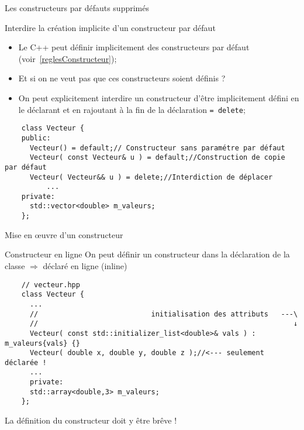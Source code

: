 \documentclass[compress,10pt,aspectratio=169]{beamer}
\begin{document}
    \begin{frame}[fragile]{Les constructeurs par défauts supprimés}
    \scriptsize
    
    \begin{block}{\small Interdire la création implicite d'un constructeur par défaut}
    \begin{itemize}
    \item Le C++ peut définir implicitement des constructeurs par défaut 
          (voir~\ref{reglesConstructeur});
    \item Et si on ne veut pas que ces constructeurs soient définis ?
    \item On peut explicitement interdire un constructeur d'être implicitement défini
          en le déclarant et en rajoutant à la fin de la déclaration \texttt{= delete};
    \end{itemize}
    \end{block}
      
    \begin{verbatim}
    class Vecteur {
    public:
      Vecteur() = default;// Constructeur sans paramétre par défaut
      Vecteur( const Vecteur& u ) = default;//Construction de copie par défaut
      Vecteur( Vecteur&& u ) = delete;//Interdiction de déplacer
          ...
    private:
      std::vector<double> m_valeurs;
    };
    \end{verbatim}
    \end{frame}
      
    \begin{frame}[fragile]{Mise en {\oe}uvre d'un constructeur}
    \scriptsize
    \begin{block}{\small Constructeur en ligne}
    On peut définir un constructeur dans la déclaration de la classe $\Rightarrow$ déclaré en ligne (inline)
    \begin{verbatim}
    // vecteur.hpp
    class Vecteur {
      ...
      //                           initialisation des attributs   ---\ 
      //                                                             ↓
      Vecteur( const std::initializer_list<double>& vals ) : m_valeurs{vals} {}   
      Vecteur( double x, double y, double z );//<--- seulement déclarée !
      ...
      private:
      std::array<double,3> m_valeurs;
    };
    \end{verbatim}
    La définition du constructeur doit y être brêve !
    \end{block}
    \end{frame}
    
\end{document}
